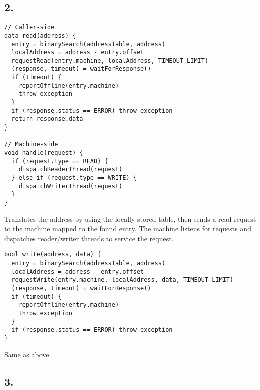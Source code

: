 \documentclass[12pt]{article}
\begin{document}
\subsection*{2.} %

\begin{verbatim}
// Caller-side
data read(address) {
  entry = binarySearch(addressTable, address)
  localAddress = address - entry.offset
  requestRead(entry.machine, localAddress, TIMEOUT_LIMIT)
  (response, timeout) = waitForResponse()
  if (timeout) {
    reportOffline(entry.machine)
    throw exception
  }
  if (response.status == ERROR) throw exception
  return response.data
}

// Machine-side
void handle(request) {
  if (request.type == READ) {
    dispatchReaderThread(request)
  } else if (request.type == WRITE) {
    dispatchWriterThread(request)
  }
}
\end{verbatim}

\noindent Translates the address by using the locally stored table, then sends a read-request to the machine mapped to the found entry. The machine listens for requests and dispatches reader/writer threads to service the request.

\begin{verbatim}
bool write(address, data) {
  entry = binarySearch(addressTable, address)
  localAddress = address - entry.offset
  requestWrite(entry.machine, localAddress, data, TIMEOUT_LIMIT)
  (response, timeout) = waitForResponse()
  if (timeout) {
    reportOffline(entry.machine)
    throw exception
  }
  if (response.status == ERROR) throw exception
}
\end{verbatim}

\noindent Same as above.

\subsection*{3.} %
\end{document}
